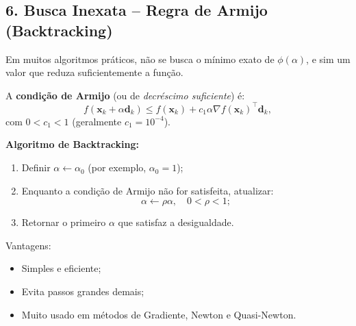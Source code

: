 \documentclass[9pt,a4paper]{extarticle}
\begin{document}
\subsection*{6. Busca Inexata -- Regra de Armijo (Backtracking)}

Em muitos algoritmos práticos, não se busca o mínimo exato de \( \phi(\alpha) \), e sim um valor que reduza suficientemente a função.

A \textbf{condição de Armijo} (ou de \emph{decréscimo suficiente}) é:
\[
f(\bm{x}_k + \alpha \bm{d}_k)
\le f(\bm{x}_k) + c_1 \alpha \nabla f(\bm{x}_k)^\top \bm{d}_k,
\]
com \( 0 < c_1 < 1 \) (geralmente \( c_1 = 10^{-4} \)).

\textbf{Algoritmo de Backtracking:}
\begin{enumerate}
  \item Definir \( \alpha \leftarrow \alpha_0 \) (por exemplo, \( \alpha_0 = 1 \));
  \item Enquanto a condição de Armijo não for satisfeita, atualizar:
  \[
  \alpha \leftarrow \rho \alpha, \quad 0 < \rho < 1;
  \]
  \item Retornar o primeiro \( \alpha \) que satisfaz a desigualdade.
\end{enumerate}

Vantagens:
\begin{itemize}
  \item Simples e eficiente;
  \item Evita passos grandes demais;
  \item Muito usado em métodos de Gradiente, Newton e Quasi-Newton.
\end{itemize}
\end{document}
